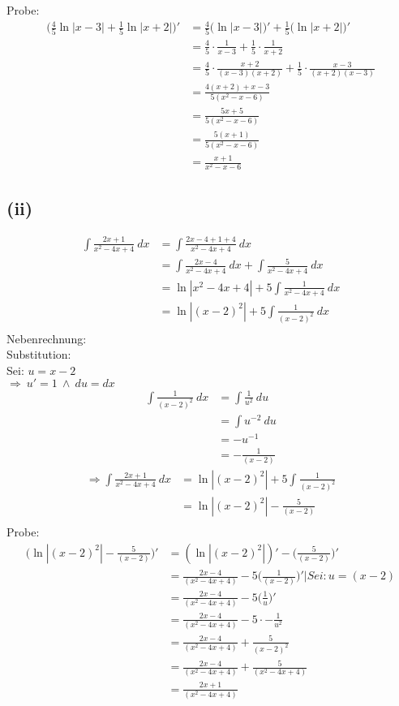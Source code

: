 \documentclass[a4paper]{scrartcl}
\begin{document}
Probe:
\begin{align}
\Big(\frac{4}{5}\ln |x-3|+\frac{1}{5}\ln |x+2|\Big)'&= \frac{4}{5}\Big(\ln |x-3|\Big)'+\frac{1}{5}\Big(\ln |x+2|\Big)'\\
	&=\frac{4}{5}\cdot\frac{1}{x-3}+\frac{1}{5}\cdot\frac{1}{x+2}\\
	&=\frac{4}{5}\cdot\frac{x+2}{(x-3)(x+2)}+\frac{1}{5}\cdot\frac{x-3}{(x+2)(x-3)}\\
	&=\frac{4(x+2)+x-3}{5(x^2 -x-6)}\\
	&=\frac{5x+5}{5(x^2 -x-6)}\\
	&=\frac{5(x+1)}{5(x^2 -x-6)}\\
	&=\frac{x+1}{x^2 -x-6}
\end{align}
\subsection{(ii)}
\begin{align}
\int \frac{2x+1}{x^2 -4x+4}\ dx &= \int \frac{2x-4 +1 +4}{x^2 -4x+4}\ dx\\
	&=\int \frac{2x-4}{x^2 -4x+4}\ dx +\int \frac{5}{x^2 -4x+4}\ dx\\
	&=\ln |x^2 -4x+4| + 5\int \frac{1}{x^2 -4x+4}\ dx\\
	&=\ln |(x-2)^2 | + 5\int \frac{1}{(x-2)^2}\ dx\\
\end{align}
Nebenrechnung:\\
Substitution:\\
Sei: \(u=x-2\)\\
\(\Rightarrow \ u'=1\ \land \ du=dx\)\\
\begin{align}
\int \frac{1}{(x-2)^2}\ dx &= \int \frac{1}{u^2}\ du\\
	&=\int u^{-2}\ du\\
	&= -u^{-1}\\
	&= -\frac{1}{(x-2)}
\end{align}
\begin{align}
\Rightarrow \int \frac{2x+1}{x^2 -4x+4}\ dx &= \ln|(x-2)^2 |+5 \int \frac{1}{(x-2)^2}\\
	&=\ln|(x-2)^2 |- \frac{5}{(x-2)}\\
\end{align}
\newpage
Probe:\\
\begin{align}
\Big(\ln|(x-2)^2 |- \frac{5}{(x-2)}\Big)'&=(\ln |(x-2)^2|)'-\Big(\frac{5}{(x-2)}\Big)'\\
	&=\frac{2x-4}{(x^2 -4x+4)}-5\Big(\frac{1}{(x-2)}\Big)'|Sei: u=(x-2)\\
	&=\frac{2x-4}{(x^2 -4x+4)}-5\Big(\frac{1}{u}\Big)'\\
	&=\frac{2x-4}{(x^2 -4x+4)}-5\cdot-\frac{1}{u^2}\\
	&=\frac{2x-4}{(x^2 -4x+4)}+\frac{5}{(x-2)^2}\\
	&=\frac{2x-4}{(x^2 -4x+4)}+\frac{5}{(x^2 -4x+4)}\\
	&=\frac{2x+1}{(x^2 -4x+4)}
\end{align}
\end{document}
